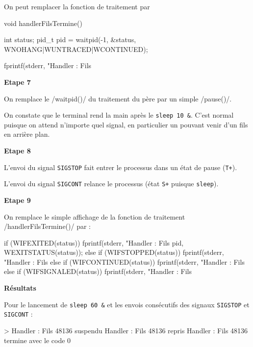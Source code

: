 \documentclass[a4paper, 12pt]{article}
\begin{document}
\bigskip
On peut remplacer la fonction de traitement par
\begin{ccode}
void handlerFilsTermine() {
	int status;
	pid_t pid = waitpid(-1, &status, WNOHANG|WUNTRACED|WCONTINUED);

	fprintf(stderr, "Handler : Fils %
}
\end{ccode}

\bigskip
\noindent
\textbf{Etape 7}

\bigskip
On remplace le \cinline/waitpid()/ du traitement du père par un simple \cinline/pause()/.

On constate que le terminal rend la main après le \texttt{sleep 10 &}. C'est normal puisque on attend n'importe quel signal, en particulier un pouvant venir d'un fils en arrière plan.

\bigskip
\noindent
\textbf{Etape 8}

\bigskip
L'envoi du signal \texttt{SIGSTOP} fait entrer le processus dans un état de pause (\texttt{T+}).

L'envoi du signal \texttt{SIGCONT} relance le processus (état \texttt{S+} puisque \texttt{sleep}).

\bigskip
\noindent
\textbf{Etape 9}

\bigskip
On remplace le simple affichage de la fonction de traitement \cinline/handlerFilsTermine()/ par :

\begin{ccode}
if (WIFEXITED(status)) {
	fprintf(stderr, "Handler : Fils %
					pid, WEXITSTATUS(status));
} else if (WIFSTOPPED(status)) {
	fprintf(stderr, "Handler : Fils %
} else if (WIFCONTINUED(status)) {
	fprintf(stderr, "Handler : Fils %
} else if (WIFSIGNALED(status)) {
	fprintf(stderr, "Handler : Fils %
}
\end{ccode}

\noindent
\textbf{Résultats}

Pour le lancement de \texttt{sleep 60 &} et les envois consécutifs des signaux \texttt{SIGSTOP} et \texttt{SIGCONT} :

\begin{bashcode}
> Handler : Fils 48136 suspendu
Handler : Fils 48136 repris
Handler : Fils 48136 termine avec le code 0
\end{bashcode}
\end{document}
